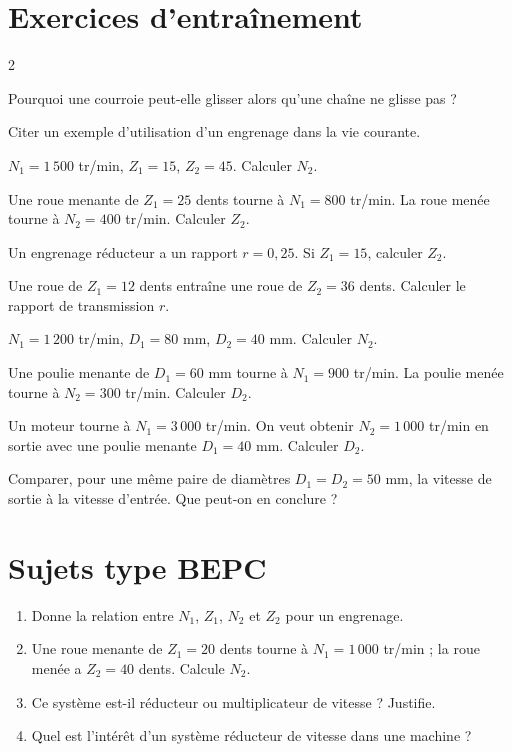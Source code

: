 \section{Exercices d'entraînement}
\begin{multicols}{2}

\exo{} Pourquoi une courroie peut-elle glisser alors qu'une chaîne ne glisse
pas ?

\exo{} Citer un exemple d'utilisation d'un engrenage dans la vie courante.

\exo{} $N_1=1\,500$ tr/min, $Z_1=15$, $Z_2=45$. Calculer $N_2$.

\exo{} Une roue menante de $Z_1=25$ dents tourne à $N_1=800$ tr/min. La roue
menée tourne à $N_2=400$ tr/min. Calculer $Z_2$.

\exo{} Un engrenage réducteur a un rapport $r=0{,}25$. Si $Z_1=15$, calculer
$Z_2$.

\exo{} Une roue de $Z_1=12$ dents entraîne une roue de $Z_2=36$ dents. Calculer
le rapport de transmission $r$.

\exo{} $N_1=1\,200$ tr/min, $D_1=80$ mm, $D_2=40$ mm. Calculer $N_2$.

\exo{} Une poulie menante de $D_1=60$ mm tourne à $N_1=900$ tr/min. La poulie
menée tourne à $N_2=300$ tr/min. Calculer $D_2$.

\exo{} Un moteur tourne à $N_1=3\,000$ tr/min. On veut obtenir $N_2=1\,000$
tr/min en sortie avec une poulie menante $D_1=40$ mm. Calculer $D_2$.

\exo{} Comparer, pour une même paire de diamètres $D_1=D_2=50$ mm, la vitesse de
sortie à la vitesse d'entrée. Que peut-on en conclure ?

\end{multicols}

\section{Sujets type BEPC}

\begin{enumerate}[label=\arabic*)]
\item Donne la relation entre $N_1$, $Z_1$, $N_2$ et $Z_2$ pour un engrenage.
\item Une roue menante de $Z_1=20$ dents tourne à $N_1=1\,000$ tr/min ; la roue menée a
$Z_2=40$ dents. Calcule $N_2$.
\item Ce système est-il réducteur ou multiplicateur de vitesse ? Justifie.
\item Quel est l'intérêt d'un système réducteur de vitesse dans une machine ?
\end{enumerate}

